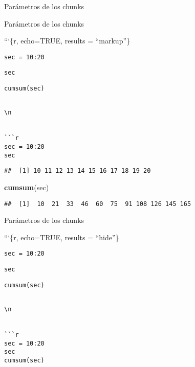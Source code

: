 \documentclass[
  ignorenonframetext,
]{beamer}
\newenvironment{Shaded}{\begin{snugshade}}{\end{snugshade}}
\newcommand{\KeywordTok}[1]{\textcolor[rgb]{0.13,0.29,0.53}{\textbf{#1}}}
\newcommand{\NormalTok}[1]{#1}
\begin{document}
\begin{frame}[fragile]{Parámetros de los chunks}
\end{frame}

\begin{frame}[fragile]{Parámetros de los chunks}
\protect\hypertarget{paruxe1metros-de-los-chunks-2}{}

```\{r, echo=TRUE, results = ``markup''\}

\texttt{sec\ =\ 10:20}

\texttt{sec}

\texttt{cumsum(sec)}

\begin{verbatim}

\n


```r
sec = 10:20
sec
\end{verbatim}

\begin{verbatim}
##  [1] 10 11 12 13 14 15 16 17 18 19 20
\end{verbatim}

\begin{Shaded}
\begin{Highlighting}[]
\KeywordTok{cumsum}\NormalTok{(sec)}
\end{Highlighting}
\end{Shaded}

\begin{verbatim}
##  [1]  10  21  33  46  60  75  91 108 126 145 165
\end{verbatim}

\end{frame}

\begin{frame}[fragile]{Parámetros de los chunks}
\protect\hypertarget{paruxe1metros-de-los-chunks-3}{}

```\{r, echo=TRUE, results = ``hide''\}

\texttt{sec\ =\ 10:20}

\texttt{sec}

\texttt{cumsum(sec)}

\begin{verbatim}

\n


```r
sec = 10:20
sec
cumsum(sec)
\end{verbatim}

\end{frame}
\end{document}
